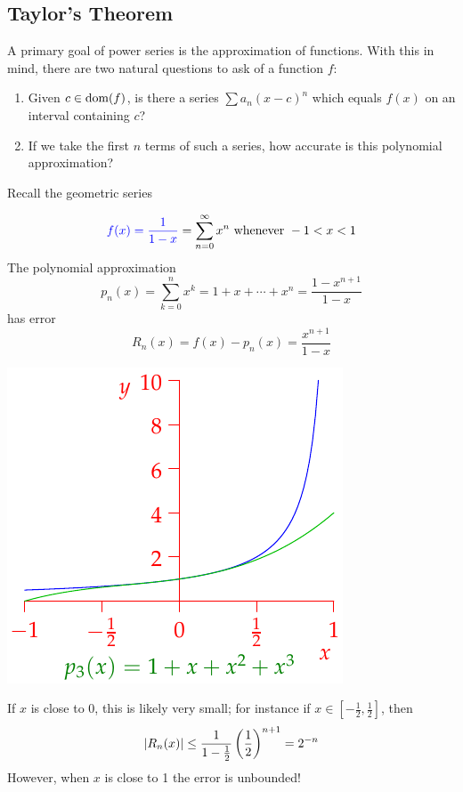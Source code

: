 \clearpage


\subsection{Taylor's Theorem}

A primary goal of power series is the approximation of functions. With this in mind, there are two natural questions to ask of a function $f$:\vspace{-2pt}
\begin{enumerate}\itemsep0pt
  \item\label{taylormotiv} Given $c\in\operatorname{dom}(f)$, is there a series $\sum a_n(x-c)^n$ which equals $f(x)$ on an interval containing $c$?
  \item If we take the first $n$ terms of such a series, how accurate is this polynomial approximation?
\end{enumerate}

\begin{example}{}{}
	Recall the geometric series\smallbreak
	\begin{minipage}[t]{0.59\linewidth}\vspace{-12pt}
		\[
			\textcolor{blue}{f(x)=\frac 1{1-x}}
			=\sum_{n=0}^\infty x^n
			\text{ whenever }-1<x<1
		\]
		The polynomial approximation
		\[
			p_n(x)=\sum_{k=0}^nx^k=1+x+\cdots+x^n 
			=\frac{1-x^{n+1}}{1-x}
		\]
		has error
		\[
			R_n(x)=f(x)-p_n(x)=\frac{x^{n+1}}{1-x}
		\]
	\end{minipage}
	\hfill
	\begin{minipage}[t]{0.4\linewidth}\vspace{-20pt}
		\flushright\includegraphics[scale=0.95]{taylor-remainder}
	\end{minipage}\medbreak
	If $x$ is close to 0, this is likely very small; for instance if $x\in\left[-\frac 12,\frac 12\right]$, then
	\[
		\left| R_n(x)\right| \le\frac 1{1-\frac 12}\left(\frac 12\right)^{n+1} =2^{-n}
	\]
	However, when $x$ is close to 1 the error is unbounded!
\end{example}

